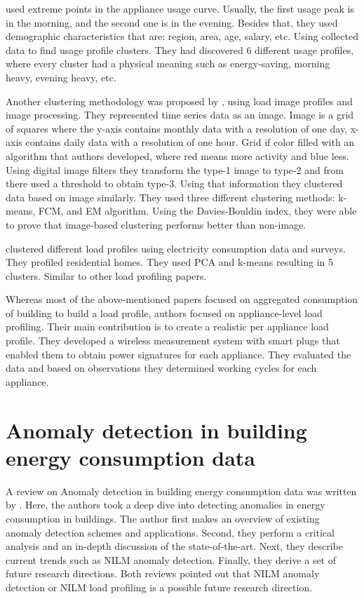 \documentclass[
11pt, %
english, %
singlespacing, %
headsepline, %
]{MastersDoctoralThesis} %
\begin{document}
\cite{Jeong2021} used extreme points in the appliance usage curve.
Usually, the first usage peak is in the morning, and the second one is in the evening. 
Besides that, they used demographic characteristics that are: region, area, age, salary, etc. 
Using collected data to find usage profile clusters. They had discovered  6 different usage profiles, 
where every cluster had a physical meaning such as energy-saving, morning heavy, evening heavy, etc.

Another clustering methodology was proposed by \cite{Park2019}, using load image profiles and image processing.
They represented time series data as an image. Image is a grid of squares where the y-axis contains monthly data with a resolution of one day,
x-axis contains daily data with a resolution of one hour. Grid if color filled with an algorithm that authors developed,
where red means more activity and blue less. Using digital image filters they transform the type-1 image to type-2 and from there
used a threshold to obtain type-3. Using that information they clustered data based on image similarly. They used three different 
clustering methods: k-means, FCM, and EM algorithm. Using the Davies-Bouldin index, they were able to prove that image-based clustering performs better than non-image.

\cite{Joana2012} clustered different load profiles using electricity consumption data and surveys. They profiled residential homes. 
They used PCA and k-means resulting in 5 clusters. Similar to other load profiling papers. 

Whereas most of the above-mentioned papers focused on aggregated consumption of building to build a load profile,
authors \cite{Issi2018} focused on appliance-level load profiling.
Their main contribution is to create a realistic per appliance load profile.
They developed a wireless measurement system with smart plugs that enabled them to obtain 
power signatures for each appliance. They evaluated the data and based on observations they determined working cycles for each appliance.

\section{Anomaly detection in building energy consumption data}

A review on Anomaly detection in building energy consumption data was written by \cite{HIMEUR2021116601}.
Here, the authors took a deep dive into detecting anomalies in energy consumption in buildings. 
The author first makes an overview of existing anomaly detection schemes and applications.
Second, they perform a critical analysis and an in-depth discussion of the state-of-the-art.
Next, they describe current trends such as NILM anomaly detection. Finally, they derive a set of future research directions. 
Both reviews pointed out that NILM anomaly detection or NILM load profiling is a possible future research direction.
\end{document}
